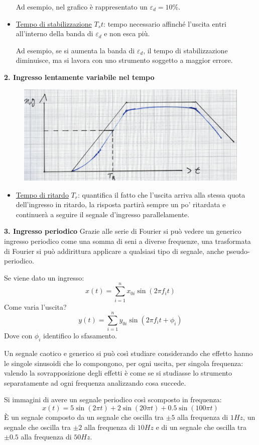 \documentclass[a4paper, 15pt]{article}
\begin{document}
\begin{adjustwidth}{2in}{}
\begin{itemize}
	Ad esempio, nel grafico è rappresentato un $\varepsilon_d=10\%$.
	\item \underline{Tempo di stabilizzazione} $T_st$: tempo necessario affinché l'uscita entri all'interno della banda di $\varepsilon_d$ e non esca più. 
	
	Ad esempio, se si aumenta la banda di $\varepsilon_d$, il tempo di stabilizzazione diminuisce, ma si lavora con uno strumento soggetto a maggior errore.
\end{itemize}
	\textbf{2. Ingresso lentamente variabile nel tempo} 
\begin{figure}[H]
	\centering
	\includegraphics[width=0.5\linewidth]{fig/screenshot049}
	\label{fig:screenshot049}
\end{figure}
	\begin{itemize}
	\item \underline{Tempo di ritardo} $T_r$: quantifica il fatto che l'uscita arriva alla stessa quota dell'ingresso in ritardo, la risposta partirà sempre un po' ritardata e continuerà a seguire il segnale d'ingresso parallelamente. 
	\end{itemize}
\newpage	
	\textbf{3. Ingresso periodico} \newline 
	Grazie alle serie di Fourier si può vedere un generico ingresso periodico come una somma di seni a diverse frequenze, una trasformata di Fourier si può addirittura applicare a qualsiasi tipo di segnale, anche pseudo-periodico. 
	
	Se viene dato un ingresso: 
	\[ x(t) = \sum_{i=1}^{n} x_{0i}\sin(2\pi f_i t)\]
	Come varia l'uscita? 
	\[ y(t) = \sum_{i=1}^{n} y_{0i}\sin(2\pi f_i t + \phi_i)\]
	Dove con $\phi_i$ identifico lo sfasamento. \newline 
	
	Un segnale caotico e generico si può così studiare considerando che effetto hanno le singole sinusoidi che lo compongono, per ogni uscita, per singola frequenza: valendo la sovrapposizione degli effetti è come se si studiasse lo strumento separatamente ad ogni frequenza analizzando cosa succede. \newline
	
	Si immagini di avere un segnale periodico così scomposto in frequenza:
	\[x(t) = 5\sin(2\pi t) + 2\sin(20\pi t) + 0.5\sin(100\pi t)  \]
	È un segnale composto da un segnale che oscilla tra $\pm 5$ alla frequenza di $1Hz$, un segnale che oscilla tra $\pm 2$ alla frequenza di $10Hz$ e di un segnale che oscilla tra $\pm 0.5$ alla frequenza di $50Hz$. \newline 
	

\end{adjustwidth}
\end{document}

